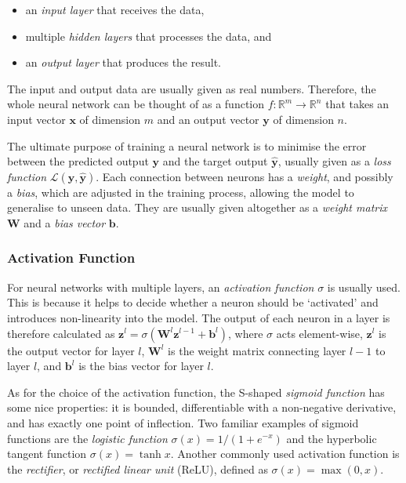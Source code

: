 \documentclass[a4paper,11pt,titlepage]{article}
\theoremstyle{definition}
\theoremstyle{plain}
\theoremstyle{remark}
\begin{document}
\begin{itemize}
    \item an \textit{input layer} that receives the data,
    \item multiple \textit{hidden layers} that processes the data, and
    \item an \textit{output layer} that produces the result.
\end{itemize}

The input and output data are usually given as real numbers. Therefore, the whole neural network can be thought of as a function $f:\mathbb{R}^m\rightarrow\mathbb{R}^n$ that takes an input vector $\mathbf{x}$ of dimension $m$ and an output vector $\mathbf{y}$ of dimension $n$.

The ultimate purpose of training a neural network is to minimise the error between the predicted output $\mathbf{y}$ and the target output $\mathbf{\hat{y}}$, usually given as a \textit{loss function} $\mathcal{L}(\mathbf{y}, \mathbf{\hat{y}})$. Each connection between neurons has a \textit{weight}, and possibly a \textit{bias}, which are adjusted in the training process, allowing the model to generalise to unseen data. They are usually given altogether as a \textit{weight matrix} $\mathbf{W}$ and a \textit{bias vector} $\mathbf{b}$.

\subsubsection{Activation Function}

For neural networks with multiple layers, an \textit{activation function} $\sigma$ is usually used. This is because it helps to decide whether a neuron should be ‘activated’ and introduces non-linearity into the model. The output of each neuron in a layer is therefore calculated as $\mathbf{z}^l=\sigma\left(\mathbf{W}^l\mathbf{z}^{l-1}+\mathbf{b}^l\right)$, where $\sigma$ acts element-wise, $\mathbf{z}^l$ is the output vector for layer $l$, $\mathbf{W}^l$ is the weight matrix connecting layer $l-1$ to layer $l$, and $\mathbf{b}^l$ is the bias vector for layer $l$. 

As for the choice of the activation function, the S-shaped \textit{sigmoid function} has some nice properties: it is bounded, differentiable with a non-negative derivative, and has exactly one point of inflection. Two familiar examples of sigmoid functions are the \textit{logistic function} $\sigma(x)=1/\left(1+e^{-x}\right)$ and the hyperbolic tangent function $\sigma(x)=\tanh x$. Another commonly used activation function is the \textit{rectifier}, or \textit{rectified linear unit} (ReLU), defined as $\sigma(x)=\max(0, x)$.
\end{document}
